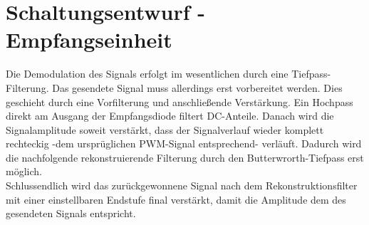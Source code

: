 \section{Schaltungsentwurf - Empfangseinheit}
Die Demodulation des Signals erfolgt im wesentlichen durch eine Tiefpass-Filterung. Das gesendete Signal muss allerdings erst vorbereitet werden. Dies geschieht durch eine Vorfilterung und anschließende Verstärkung. Ein Hochpass direkt am Ausgang der Empfangsdiode filtert DC-Anteile. Danach wird die Signalamplitude soweit verstärkt, dass der Signalverlauf wieder komplett rechteckig -dem ursprüglichen PWM-Signal entsprechend- verläuft. Dadurch wird die nachfolgende rekonstruierende Filterung durch den Butterwrorth-Tiefpass erst möglich.\\ Schlussendlich wird das zurückgewonnene Signal nach dem Rekonstruktionsfilter mit einer einstellbaren Endstufe final verstärkt, damit die Amplitude dem des gesendeten Signals entspricht.\\

